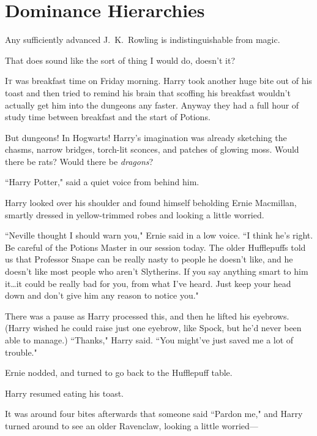 \chapter{Dominance Hierarchies}

\begin{chapterOpeningAuthorNote}
Any sufficiently advanced J.~K.~Rowling is indistinguishable from magic.
\end{chapterOpeningAuthorNote}
\begin{chapterOpeningQuote}
That does sound like the sort of thing I would do, doesn't it?
\end{chapterOpeningQuote}

\lettrine{I}{t} was breakfast time on Friday morning. Harry took another huge bite out of his toast and then tried to remind his brain that scoffing his breakfast wouldn't actually get him into the dungeons any faster. Anyway they had a full hour of study time between breakfast and the start of Potions.

But dungeons! In Hogwarts! Harry's imagination was already sketching the chasms, narrow bridges, torch-lit sconces, and patches of glowing moss. Would there be rats? Would there be \emph{dragons}?

``Harry Potter," said a quiet voice from behind him.

Harry looked over his shoulder and found himself beholding Ernie Macmillan, smartly dressed in yellow-trimmed robes and looking a little worried.

``Neville thought I should warn you," Ernie said in a low voice. ``I think he's right. Be careful of the Potions Master in our session today. The older Hufflepuffs told us that Professor Snape can be really nasty to people he doesn't like, and he doesn't like most people who aren't Slytherins. If you say anything smart to him it…it could be really bad for you, from what I've heard. Just keep your head down and don't give him any reason to notice you."

There was a pause as Harry processed this, and then he lifted his eyebrows. (Harry wished he could raise just one eyebrow, like Spock, but he'd never been able to manage.) ``Thanks," Harry said. ``You might've just saved me a lot of trouble."

Ernie nodded, and turned to go back to the Hufflepuff table.

Harry resumed eating his toast.

It was around four bites afterwards that someone said ``Pardon me," and Harry turned around to see an older Ravenclaw, looking a little worried—

